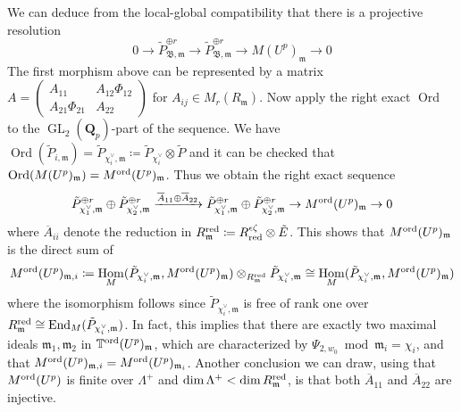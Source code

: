\documentclass[leqno]{amsart}
\theoremstyle{definition}
\theoremstyle{remark}
\newcommand{\smat}[1]{\left(\begin{smallmatrix} #1 \end{smallmatrix}\right)}
\newcommand{\Qp}{\mathbf{Q}_p}
\newcommand{\A}{\mathbf A}
\DeclareMathOperator{\End}{End}
\DeclareMathOperator{\Hom}{Hom}
\DeclareMathOperator{\GL}{GL}
\newcommand{\fm}{\mathfrak{m}}
\DeclareMathOperator{\Ord}{Ord} %
\newcommand{\B}{\mathfrak B} %
\newcommand{\red}{\textnormal{red}}
\newcommand{\TT}{\mathbb{T}} %
\newcommand{\ord}{\textnormal{ord}} %
\begin{document}
We can deduce from the local-global compatibility that 
there is a projective resolution
\begin{equation*}
0\to \tilde{P}_{\B,\fm}^{\oplus r}\to 
\tilde{P}_{\B,\fm}^{\oplus r}\to 
M(U^p)_{\fm}\to 0
\end{equation*}
The first morphism above can be represented by a matrix
$A=\smat{A_{11} & A_{12}\Phi_{12}\\A_{21}\Phi_{21} & A_{22}}$
for $A_{ij}\in M_r(R_{\fm})$.
Now apply the right exact $\Ord$ to the $\GL_2(\Qp)$-part of the sequence.
We have $\Ord(\tilde{P}_{i,\fm})=\tilde{P}_{\chi_i^\vee,\fm}\coloneqq
\tilde{P}_{\chi_i^\vee}\otimes \tilde{P}$ and it can be checked that
$\Ord(M(U^p)_\fm)=M^{\ord}(U^p)_\fm$.
Thus we obtain the right exact sequence
\begin{equation}\label{eq:presentord}
	\tilde{P}_{\chi_1^\vee,\fm}^{\oplus r}\oplus 
	\tilde{P}_{\chi_2^\vee,\fm}^{\oplus r}
	\xrightarrow{\overline{A}_{11}\oplus\overline{A}_{22}}
	\tilde{P}_{\chi_1^\vee,\fm}^{\oplus r}\oplus 
	\tilde{P}_{\chi_2^\vee,\fm}^{\oplus r}
	\to M^{\ord}(U^p)_\fm\to 0
\end{equation}
where $\overline{A}_{ii}$ denote the reduction in 
$R^\red_\fm\coloneqq R^{\epsilon\zeta}_\red\otimes\tilde{E}$.
This shows that $M^{\ord}(U^p)_\fm$ is the direct sum of 
\[
    M^{\ord}(U^p)_{\fm,i}\coloneqq 
    \Hom_{M}(\tilde{P}_{\chi_i^\vee,\fm}, M^{\ord}(U^p)_\fm)
    \otimes_{R_\fm^\red}
    \tilde{P}_{\chi_i^\vee,\fm}\cong 
    \Hom_{M}(\tilde{P}_{\chi_i^\vee,\fm}, M^{\ord}(U^p)_\fm)
\]
where the isomorphism follows
since $\tilde{P}_{\chi_i^\vee,\fm}$ is free of rank one
over $R_\fm^\red\cong \End_M(\tilde{P}_{\chi_i^\vee,\fm})$.
In fact, this implies that there are exactly two maximal ideals 
$\fm_1,\fm_2$ in $\TT^{\ord}(U^p)_{\fm}$,
which are characterized by $\Psi_{2,w_0}\bmod \fm_i=\chi_i$,
and that $M^{\ord}(U^p)_{\fm,i}=M^{\ord}(U^p)_{\fm_i}$.
Another conclusion we can draw,
using that $M^{\ord}(U^p)$ is finite over $\Lambda^+$
and $\dim\Lambda^+<\dim R_\fm^\red$, is that both
$\overline{A}_{11}$ and $\overline{A}_{22}$ are injective.
\end{document}
